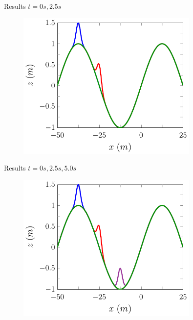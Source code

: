 \documentclass[handout]{beamer}
\begin{document}
\begin{frame}{Results $t=0s,2.5s$}
	\begin{figure}
		\includegraphics[width=0.8\textwidth]{./Pics/DryBed/Forced/Stages025.pdf}
	\end{figure}
\end{frame}

\begin{frame}{Results $t=0s,2.5s,5.0s$}
	\begin{figure}
		\includegraphics[width=0.8\textwidth]{./Pics/DryBed/Forced/Stages02550.pdf}
	\end{figure}
\end{frame}
\end{document}

